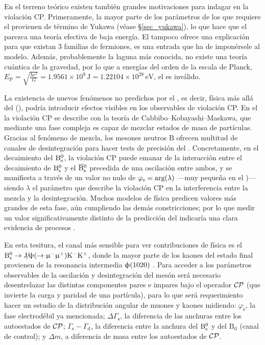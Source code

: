 En el terreno teórico existen también grandes motivaciones para indagar en la violación CP. 
Primeramente, la mayor parte de los parámetros de los que requiere el \stdmod provienen de término de Yukawa (véase \S\ref{sec_yukawa}), lo que hace que el \stdmod parezca una teoría efectiva de baja energía. El \stdmod tampoco ofrece una explicación para que existan 3 familias de fermiones, es una entrada que ha de imponérsele al modelo. Además, probablemente la laguna más conocida, no existe una teoría cuántica de la gravedad, por lo que a energías del orden de la escala de Planck, $E_\mathrm{P} = \sqrt{\frac{\hbar c^5}{G}} =  1.9561\times10^{9} \, \mathrm{J} = 1.22104\times10^{28} \, \mathrm{eV}$, el \stdmod es inválido.


La existencia de nuevos fenómenos no predichos por el \stdmod, es decir, física más allá del \stdmod (\bstdmod), podría introducir efectos visibles en los observables de violación CP. En el \stdmod la violación CP se describe con la teoría de Cabbibo--Kobayashi--Maskawa, que mediante una fase compleja es capaz de mezclar estados de masa de partículas.
Gracias al fenómeno de mezcla, los mesones neutros $\mathrm{B}$ ofrecen multitud de canales de desintegración para hacer tests de precisión del  \stdmod.
Concretamente, en el decaimiento del $\mathrm{B}{}_{\mathrm{s}}^{0}$, la violación CP puede emanar de la interacción entre el decaimiento de $\mathrm{B}{}_{\mathrm{s}}^{0}$ y el $\overline{\mathrm{B}}{}_{\mathrm{s}}^{0}$  precedida de una oscilación entre ambos, y se manifiesta a través de un valor no nulo de $\varphi_{\mathrm{s}} = \text{arg}(\lambda)$ ---muy pequeña en el \stdmod)--- siendo $\lambda$ el parámetro que describe la violación CP en la interferencia entre la mezcla y la desintegración.
Muchos modelos de física \bstdmod predicen valores más grandes de esta fase, aún cumpliendo las demás constricciones; por lo que medir un valor significativamente distinto de la predicción del \stdmod indicaría una clara evidencia de procesos \bstdmod.


En esta tesitura, el canal más sensible para ver contribuciones de física \bstdmod es el $\mathrm{B}{}_{\mathrm{s}}^{0} \rightarrow \mathrm{J}\!/\!\uppsi(\rightarrow \upmu{}^{-} \upmu{}^{+}) \mathrm{K}{}^{-} \mathrm{K}{}^{+}$, donde la mayor parte de los kaones del estado final provienen de la resonancia intermedia $\upphi(1020)$ \cite{faller2009precision}. Para acceder a los parámetros observables de la oscilación y desintegración del mesón será necesario desentrelazar las distintas componentes pares e impares bajo el operador $\mathcal{CP}$ (que invierte la carga y paridad de una partícula), para lo que será requerimiento hacer un estudio de la distribución angular de muones y kaones midiendo: $\varphi_{\text{s}}$, la fase electrodébil ya mencionada;  $\Delta\Gamma_{\text{s}}$, la diferencia de las anchuras entre los autoestados de $\mathcal{CP}$; $\Gamma_{\text{s}}-\Gamma_{\text{d}}$, la diferencia entre la anchura del $\mathrm{B}{}_{\mathrm{s}}^{0}$ y del $\text{B}_{\text{d}}$ (canal de control); y $\Delta m$, a diferencia de masa entre los autoestados de $\mathcal{CP}$.


